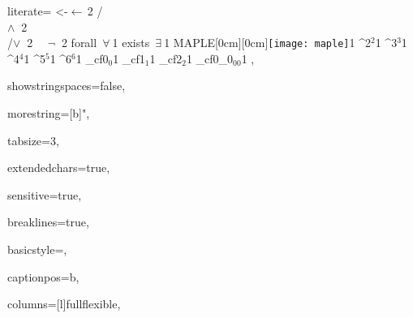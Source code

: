 {%
 literate=
	{<-}{{$\leftarrow\,$}}2
        {/\\}{{$\wedge\;\;$}}2
        {\\/}{{$\vee\;\;$}}2
        {~~}{{$\lnot\;\;$}}2
	{forall\ }{{$\forall\ \!$}}1
	{exists\ }{{$\exists\ \!$}}1
        {MAPLE}{{\raisebox{-0.8cm}[0cm][0cm]{\hspace{18mm}\texttt{[image: maple]}}}}1
	{^2}{{$^2$}}1
	{^3}{{$^3$}}1
	{^4}{{$^4$}}1
	{^5}{{$^5$}}1
	{^6}{{$^6$}}1
        {_cf0}{{$_{{0}}$}}1
        {_cf1}{{$_{{1}}$}}1
        {_cf2}{{$_{{2}}$}}1
        {_cf0_0}{{$_{{00}}$}}1
,


showstringspaces=false,

morestring=[b]",

tabsize=3,

extendedchars=true,

sensitive=true,

breaklines=true,

basicstyle=\ttfamily\footnotesize,

captionpos=b,

columns=[l]fullflexible,

}
